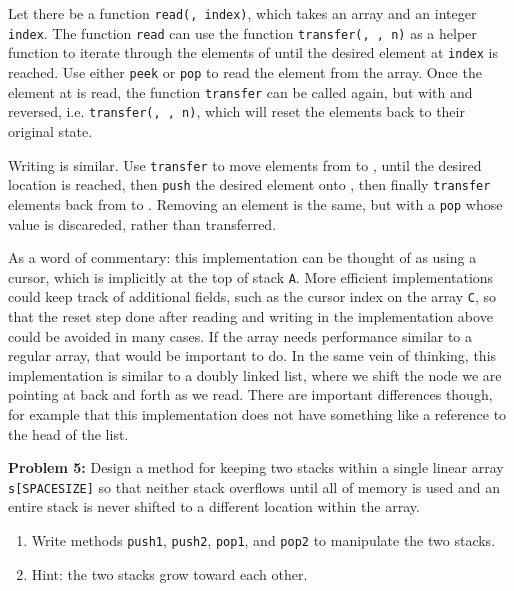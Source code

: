 \documentclass[12pt,letterpaper,final]{report}
\begin{document}
Let there be a function \texttt{read(\gamma, index)}, which takes an array \texttt{\gamma} and an integer \texttt{index}. The function \texttt{read} can use the function \texttt{transfer(\alpha, \beta, n)} as a helper function to iterate through the elements of \texttt{\gamma} until the desired element at \texttt{index} is reached. Use either \texttt{peek} or \texttt{pop} to read the element from the array. Once the element at \texttt{\gamma[index]} is read, the function \texttt{transfer} can be called again, but with \texttt{\alpha} and \texttt{\beta} reversed, i.e. \texttt{transfer(\beta, \alpha, n)}, which will reset the elements back to their original state.

Writing is similar. Use \texttt{transfer} to move elements from \texttt{\alpha} to \texttt{\beta}, until the desired location is reached, then \texttt{push} the desired element onto \texttt{\alpha}, then finally \texttt{transfer} elements back from \texttt{\beta} to \texttt{\alpha}. Removing an element is the same, but with a \texttt{pop} whose value is discareded, rather than transferred.

As a word of commentary: this implementation can be thought of as using a cursor, which is implicitly at the top of stack \texttt{A}. More efficient implementations could keep track of additional fields, such as the cursor index on the array \texttt{C}, so that the reset step done after reading and writing in the implementation above could be avoided in many cases. If the array needs performance similar to a regular array, that would be important to do. In the same vein of thinking, this implementation is similar to a doubly linked list, where we shift the node we are pointing at back and forth as we read. There are important differences though, for example that this implementation does not have something like a reference to the head of the list.

\pagebreak
\noindent\textbf{Problem 5:}
Design a method for keeping two stacks within a single linear array \texttt{s[SPACESIZE]} so that neither stack overflows until all of memory is used and an entire stack is never shifted to a different location within the array.
\begin{enumerate}
  \item Write methods \texttt{push1}, \texttt{push2}, \texttt{pop1}, and \texttt{pop2} to manipulate the two stacks.
  \item Hint: the two stacks grow toward each other.
\end{enumerate}
\end{document}
